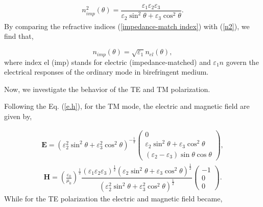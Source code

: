 \documentclass[9pt,twocolumn,twoside]{osajnl}
\begin{document}
\begin{align}\label{impedance-match index}
n_{imp}^{2}(\theta)=\dfrac{\varepsilon_{1}\varepsilon_{2}\varepsilon_{3}}{\varepsilon_{2}\sin^{2}{\theta}+\varepsilon_{3}\cos^{2}{\theta}}.
\end{align}
By comparing the refractive indices (\ref{impedance-match index}) with (\ref{n2}), we find that,

\begin{equation}\label{comper-n}
n_{imp}(\theta)=\sqrt{\varepsilon_{1}}n_{el}(\theta),
\end{equation}
where index el (imp) stands for  electric (impedance-matched) and ${\varepsilon_{1}}n$ govern the electrical responses of the ordinary mode in birefringent medium.

 Now, we investigate the behavior of the TE and TM polarization.
 
Following the Eq. (\ref{e.h}),  for the TM mode, the electric and magnetic field are given by,

 \begin{align}
  \mathbf{E}=\left(\varepsilon_{2}^{2} \sin^{2}{\theta} + \varepsilon_{3}^{2}\cos^{2}{\theta}\right)^{-\frac{1}{2}}
 \begin{pmatrix}
 0\\
  \varepsilon_{2} \sin^{2}\theta + \varepsilon_{3}\cos^{2}\theta\\
 (\varepsilon_{2}-\varepsilon_{3})\sin\theta\cos\theta
 \end{pmatrix},
\end{align}
\begin{align}
  \mathbf{H}=\left(\frac{\varepsilon_{0}}{\mu_{0}}\right)^{\frac{1}{2}}\dfrac{(\varepsilon_{1}\varepsilon_{2}\varepsilon_{3})^{\frac{1}{2}}({\varepsilon_{2}\sin^{2}{\theta}+\varepsilon_{3}\cos^{2}{\theta}})^{\frac{1}{2}}}{(\varepsilon_{2}^{2} \sin^{2}{\theta} + \varepsilon_{3}^{2}\cos^{2}{\theta})^{\frac{1}{2}}}
 \begin{pmatrix}
 -1\\0\\0
 \end{pmatrix}.
 \end{align}
While for the TE polarization the electric and magnetic field became,
\end{document}
